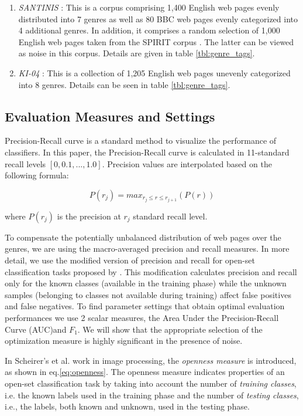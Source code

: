 \documentclass[runningheads]{llncs}
\begin{document}
\begin{enumerate}
\item \textit{SANTINIS} \citep{mehler2010genres_on_web}: This is a corpus comprising 1,400 English web pages evenly distributed into 7 genres as well as 80 BBC web pages evenly categorized into 4 additional genres. In addition, it comprises a random selection of 1,000 English web pages taken from the SPIRIT corpus \citep{joho2004spirit}. The latter can be viewed as noise in this corpus. Details are given in table \ref{tbl:genre_tags}.
\item \textit{KI-04} \citep{meyer2004genre}: This is a collection of 1,205 English web pages unevenly categorized into 8 genres. Details can be seen in table \ref{tbl:genre_tags}.
\end{enumerate}


\subsection{Evaluation Measures and Settings}\label{sec:evaluation_measures}

Precision-Recall curve is a standard method to visualize the performance of classifiers. In this paper, the Precision-Recall curve is calculated in 11-standard recall levels $[0,0.1,...,1.0]$. Precision values are interpolated based on the following formula:

\begin{equation}
	P(r_j)=max_{r_j \leqslant r \leqslant r_{j+1}}(P(r))
\end{equation}

\noindent
where $P(r_j)$ is the precision at $r_j$ standard recall level.

To compensate the potentially unbalanced distribution of web pages over the genres, we are using the macro-averaged precision and recall measures. In more detail, we use the modified version of precision and recall for open-set classification tasks proposed by \citep{mendesjunior2016}. This modification calculates precision and recall only for the known classes (available in the training phase) while the unknown samples (belonging to classes not available during training) affect false positives and false negatives. To find parameter settings that obtain optimal evaluation performances we use 2 scalar measures, the Area Under the Precision-Recall Curve (AUC)and $F_{1}$. We will show that the appropriate selection of the optimization measure is highly significant in the presence of noise.

In Scheirer's et al. \citep{scheirer2013toward} work in image processing, the \textit{openness measure} is introduced, as shown in eq.\ref{eq:openness}. The openness measure indicates properties of an open-set classification task by taking into account the number of \textit{training classes}, i.e. the known labels used in the training phase and the number of \textit{testing classes}, i.e., the labels, both known and unknown, used in the testing phase.
\end{document}

